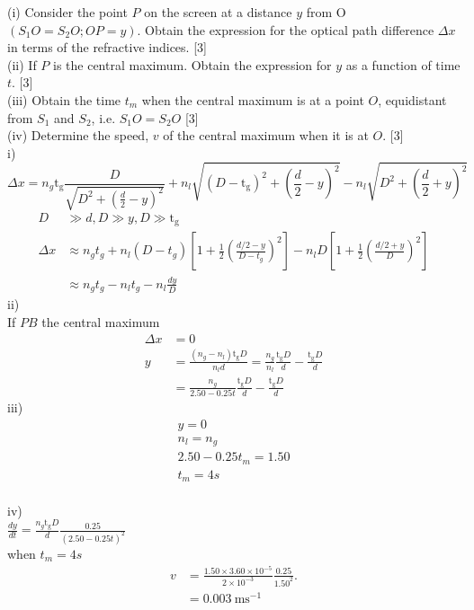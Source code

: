 \documentclass{article}
\begin{document}
(i) Consider the point $P$ on the screen at a distance $y$ from O $(S_{1} O=S_{2} O ; O P=y)$. Obtain the expression for the optical path difference $\Delta x$ in terms of the refractive indices. [3] \\
(ii) If $P$ is the central maximum. Obtain the expression for $y$ as a function of time $t$. [3] \\
(iii) Obtain the time $t_{m}$ when the central maximum is at a point $O$, equidistant from $S_{1}$ and $S_{2}$, i.e. $S_{1} O=S_{2} O$ [3] \\
(iv) Determine the speed, $v$ of the central maximum when it is at $O$. [3]\\

i)
$$
\Delta x=n_g \operatorname{t_g} \frac{D}{\sqrt{D^2+\left(\frac{d}{2}-y\right)^2}}+n_l \sqrt{(D-\operatorname{t_g})^2+\left(\frac{d}{2}-y\right)^2}-n_l  \sqrt{D^2+\left(\frac{d}{2}+y\right)^2}
$$
$$
\begin{aligned}
D & \gg d, D \gg y, D \gg \operatorname{t_g} \\
\Delta x & \approx n_g t_g+n_l(D-t_g)\left[1+\frac{1}{2}\left(\frac{d / 2-y}{D-t_g}\right)^2\right]-n_l D\left[1+\frac{1}{2}\left(\frac{d / 2+y}{D}\right)^2\right] \\
& \approx n_g t_g-n_l t_g-n_l \frac{d y}{D}
\end{aligned}
$$
ii)\\
If $P B$ the central maximum
$$
\begin{aligned}
\Delta x & =0 \\
y & =\frac{(n_g-n_l) \operatorname{t_g} D}{n_l d}=\frac{n_g}{n_l} \frac{\operatorname{t_g} D}{d}-\frac{\operatorname{t_g} D}{d} \\
& =\frac{n_g}{2.50-0.25 t} \frac{\operatorname{t_g} D}{d}-\frac{\operatorname{t_g} D}{d}
\end{aligned}
$$
iii)
$$
\begin{gathered}
y=0 \\
n_l=n_g \\
2.50-0.25 t_m=1.50 \\
t_m=4s
\end{gathered}
$$\\
iv) \\
$\frac{d y}{d t}=\frac{n_g \operatorname{t_g} D}{d}\frac{0.25}{(2.50-0.25 t)^2}$\\
when $t_m=4s$\\
$$
\begin{aligned}
v & =\frac{1.50 \times 3.60 \times 10^{-5}}{2 \times 10^{-3}} \frac{0.25}{1.50^2} . \\
& =0.003 \mathrm{~ms}^{-1}
\end{aligned}
$$
\end{document}
